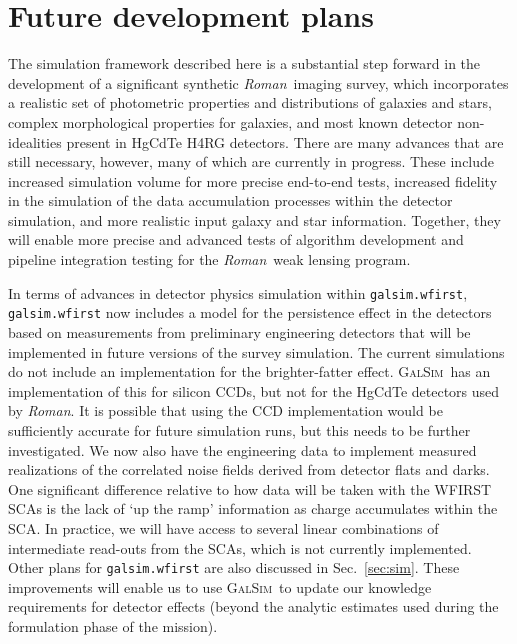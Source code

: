 \documentclass[usenatbib]{mnras}
\newcommand{\galsim}{\textsc{GalSim}}
\newcommand{\wfirst}{{\slshape Roman}}
\begin{document}
\section{Future development plans}\label{sec:future}

The simulation framework described here is a substantial step forward in the development of a significant synthetic \wfirst\ imaging survey, which incorporates a realistic set of photometric properties and distributions of galaxies and stars, complex morphological properties for galaxies, and most known detector non-idealities present in HgCdTe H4RG detectors. 
There are many advances that are still necessary, however, many of which are currently in progress. 
These include increased simulation volume for more precise end-to-end tests, increased fidelity in the simulation of the data accumulation processes within the detector simulation, and more realistic input galaxy and star information. 
Together, they will enable more precise and advanced tests of algorithm development and pipeline integration testing for the \wfirst\ weak lensing program.

In terms of advances in detector physics simulation within \texttt{galsim.wfirst}, \texttt{galsim.wfirst} now includes a model for the persistence effect in the detectors based on measurements from preliminary engineering detectors that will be implemented in future versions of the survey simulation. 
The current simulations do not include an implementation for the brighter-fatter effect. \galsim\ has an implementation of this for silicon CCDs, but not for the HgCdTe detectors used by \wfirst.  
It is possible that using the CCD implementation would be sufficiently accurate for future simulation runs, but this needs to be further investigated. 
We now also have the engineering data to implement measured realizations of the correlated noise fields derived from detector flats and darks. 
One significant difference relative to how data will be taken with the WFIRST SCAs is the lack of `up the ramp' information as charge accumulates within the SCA. 
In practice, we will have access to several linear combinations of intermediate read-outs from the SCAs, which is not currently implemented. 
Other plans for \texttt{galsim.wfirst} are also discussed in Sec.~\ref{sec:sim}. These improvements will enable us to use \galsim\ to update our knowledge requirements for detector effects (beyond the analytic estimates used during the formulation phase of the mission).  
\end{document}
